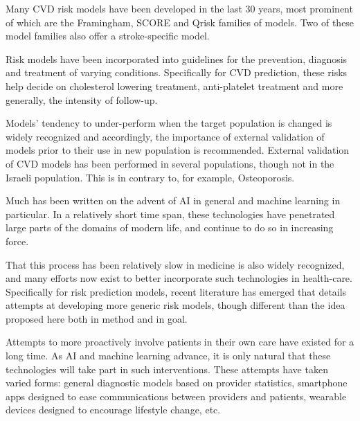 \documentclass[a4paper,12pt]{article}
\begin{document}
	Many CVD risk models have been developed in the last 30 years, most prominent of which are the Framingham\cite{Wilson1998,NationalCholesterolEducationProgramNCEPExpertPanelonDetection2002,DAgostino2008,Goff2014}, SCORE\cite{Conroy2003} and Qrisk\cite{Hippisley-Cox2007,Hippisley-Cox2008} families of models.	Two of these model families also offer a stroke-specific model\cite{Wolf1991,DAgostino1994,Hippisley-Cox2013}.
	
	Risk models have been incorporated into guidelines for the prevention, diagnosis and treatment of varying conditions. Specifically for CVD prediction, these risks help decide on cholesterol lowering treatment, anti-platelet treatment and more generally, the intensity of follow-up\cite{NationalCholesterolEducationProgramNCEPExpertPanelonDetection2002,Graham2007,Goff2014,Bibbins-Domingo2016}.
	
	Models' tendency to under-perform when the target population is changed is widely recognized\cite{DAgostino2001,Bastuji-Garin2002,DeFilippis2015} and accordingly, the importance of external validation of models prior to their use in new population is recommended\cite{Moons2012}. External validation of CVD models has been performed in several populations\cite{DAgostino2001,Bastuji-Garin2002,DeFilippis2015}, though not in the Israeli population\cite{Bitzur2015}. This is in contrary to, for example, Osteoporosis\cite{Dagan2017}.
	
	Much has been written on the advent of AI in general and machine learning in particular. In a relatively short time span, these technologies have penetrated large parts of the domains of modern life, and continue to do so in increasing force\cite{Ng2017}.
	
	That this process has been relatively slow in medicine is also widely recognized, and many efforts now exist to better incorporate such technologies in health-care\cite{Obermeyer2016}. Specifically for risk prediction models, recent literature has emerged that details attempts at developing more generic risk models, though different than the idea proposed here both in method and in goal\cite{Rajkomar2018}.
	
	Attempts to more proactively involve patients in their own care have existed for a long time\cite{MedicineUSCommitteeonQualityofHealthCareinAmerica2001}. As AI and machine learning advance, it is only natural that these technologies will take part in such interventions. These attempts have taken varied forms: general diagnostic models based on provider statistics\cite{Aurbach2018}, smartphone apps designed to ease communications between providers and patients\cite{Sundberg2017}, wearable devices designed to encourage lifestyle change\cite{Gordon2017}, etc.
	
\end{document}
